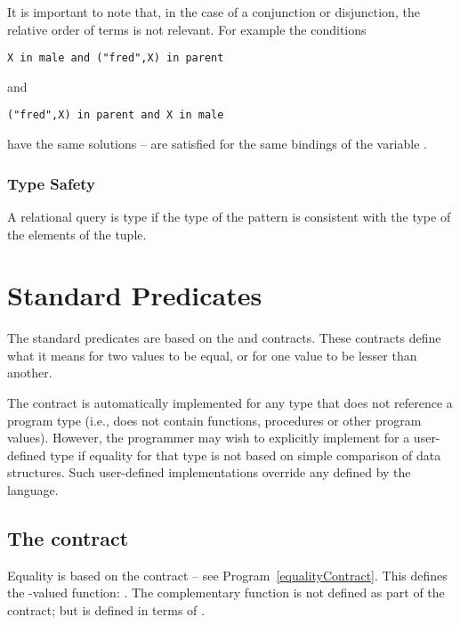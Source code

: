 \begin{aside}
It is important to note that, in the case of a conjunction or disjunction, the relative order of terms is not relevant. For example the conditions
\begin{lstlisting}
X in male and ("fred",X) in parent
\end{lstlisting}
and
\begin{lstlisting}
("fred",X) in parent and X in male
\end{lstlisting}
have the same solutions -- are satisfied for the same bindings of the variable .
\end{aside}

\subsubsection{Type Safety}
\label{querytypesatty}
A relational query is type if the type of the pattern is consistent with the type of the elements of the tuple.

\section{Standard Predicates}
\label{predicates}

The standard predicates are based on the  and  contracts. These contracts define what it means for two values to be equal, or for one value to be lesser than another.

The  contract is automatically implemented for any type that does not reference a program type (i.e., does not contain functions, procedures or other program values). However, the programmer may wish to explicitly implement  for a user-defined type if equality for that type is not based on simple comparison of data structures. Such user-defined implementations override any defined by the language.

\subsection{The  contract}
\label{equalityPredicates}
Equality is based on the  contract -- see Program~\vref{equalityContract}. This defines the -valued function: \q{=}. The complementary function \q{!=} is not defined as part of the  contract; but is defined in terms of \q{=}.

